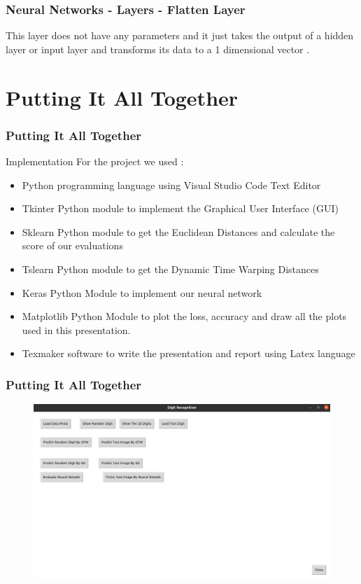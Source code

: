 \documentclass{beamer}
\begin{document}
\begin{frame}
\frametitle{Neural Networks - Layers - Flatten Layer}
\begin{block}{}
This layer does not have any parameters and it just takes the output of a hidden layer or input layer and transforms its data to a 1 dimensional vector .
\end{block}
\end{frame}

\section{Putting It All Together}

\begin{frame}
\frametitle{Putting It All Together}
\begin{block}{Implementation}
For the project we used :
\begin{itemize}
\item Python programming language using Visual Studio Code Text Editor
\item Tkinter Python module to implement the Graphical User Interface (GUI)
\item Sklearn Python module to get the Euclidean Distances and calculate the score of our evaluations
\item Tslearn Python module to get the Dynamic Time Warping Distances
\item Keras Python Module to implement our neural network
\item Matplotlib Python Module to plot the loss, accuracy and draw all the plots used in this presentation.
\item Texmaker software to write the presentation and report using Latex language
\end{itemize}

\end{block}
\end{frame}

\begin{frame}
\frametitle{Putting It All Together}
\begin{figure}
\centering
\includegraphics[scale=0.25]{MY_GUI.png}
\end{figure}
\end{frame}
\end{document}
